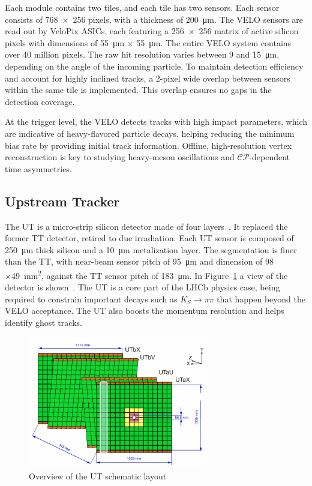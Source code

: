 Each module contains two tiles, and each tile has two sensors. Each sensor consists of 768~×~256 pixels, with a thickness of \SI{200}{\micro\meter}. 
The VELO sensors are read out by VeloPix ASICs, each featuring a 256~×~256 matrix of active silicon pixels with dimensions of \SI{55}{\micro\meter} × \SI{55}{\micro\meter}. The entire VELO system contains over 40 million pixels. The raw hit resolution varies between $9$ and \SI{15}{\micro\meter}, depending on the angle of the incoming particle. To maintain detection efficiency and account for highly inclined tracks, a 2-pixel wide overlap between sensors within the same tile is implemented. This overlap ensures no gaps in the detection coverage.

At the trigger level, the VELO detects tracks with high impact parameters, which are indicative of heavy-flavored particle decays, helping reducing the minimum bias rate by providing initial track information. Offline, high-resolution vertex reconstruction is key to studying heavy-meson oscillations and $\mathcal{CP}$-dependent time asymmetries.
\subsection{Upstream Tracker}
The UT is a micro-strip silicon detector made of four layers~\cite{LHCb:2014uqj}. It replaced the former TT detector, retired to due irradiation. Each UT sensor is composed of \SI{250}{\micro\meter} thick silicon and a \SI{10}{\micro\meter} metalization layer. The segmentation is finer than the TT, with near-beam sensor pitch of \SI{95}{\micro\meter} and dimension of $98$×\SI{49}{\milli\meter\squared}, against the TT sensor pitch of \SI{183}{\micro\meter}. In Figure~\ref{fig:UT} a view of the detector is shown~\cite{ut}. 
The UT is a core part of the LHCb physics case, being required to constrain important decays such as $K_S \rightarrow\pi\pi$ that happen beyond the VELO acceptance. The UT also boosts the momentum resolution and helps identify ghost tracks.

\begin{figure}
    \centering
    \includegraphics[width=0.7\textwidth]{figures/UT.png}
    \caption{Overview of the UT schematic layout}
    \label{fig:UT}
\end{figure}

